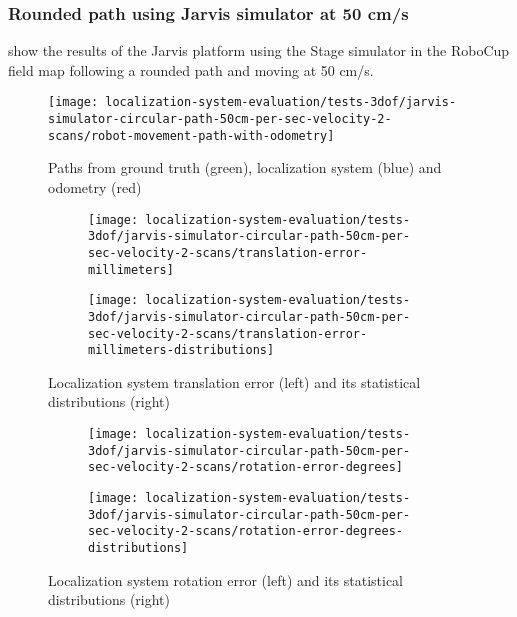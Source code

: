 \subsubsection{Rounded path using Jarvis simulator at 50 cm/s}

 show the results of the Jarvis platform using the Stage simulator in the RoboCup field map following a rounded path and moving at 50 cm/s.

\begin{figure}[H]
	\centering
	\texttt{[image: localization-system-evaluation/tests-3dof/jarvis-simulator-circular-path-50cm-per-sec-velocity-2-scans/robot-movement-path-with-odometry]}
	\caption{Paths from ground truth (green), localization system (blue) and odometry (red)}
	\label{fig:localization-system-evaluation_jarvis-simulator-circular-path-50cm-per-sec-velocity-2-scans}
\end{figure}

\begin{figure}[H]
	\centering
	\begin{subfigure}[h]{0.47\textwidth}
		\centering
		\texttt{[image: localization-system-evaluation/tests-3dof/jarvis-simulator-circular-path-50cm-per-sec-velocity-2-scans/translation-error-millimeters]}
	\end{subfigure}
	\begin{subfigure}[h]{0.47\textwidth}
		\centering
		\texttt{[image: localization-system-evaluation/tests-3dof/jarvis-simulator-circular-path-50cm-per-sec-velocity-2-scans/translation-error-millimeters-distributions]}
	\end{subfigure}
	\caption{Localization system translation error (left) and its statistical distributions (right)}
	\label{fig:localization-system-evaluation_jarvis-simulator-circular-path-50cm-per-sec-velocity-2-scans_translation-errors}
\end{figure}

\begin{figure}[H]
	\centering
	\begin{subfigure}[h]{0.47\textwidth}
		\centering
		\texttt{[image: localization-system-evaluation/tests-3dof/jarvis-simulator-circular-path-50cm-per-sec-velocity-2-scans/rotation-error-degrees]}
	\end{subfigure}
	\begin{subfigure}[h]{0.47\textwidth}
		\centering
		\texttt{[image: localization-system-evaluation/tests-3dof/jarvis-simulator-circular-path-50cm-per-sec-velocity-2-scans/rotation-error-degrees-distributions]}
	\end{subfigure}
	\caption{Localization system rotation error (left) and its statistical distributions (right)}
	\label{fig:localization-system-evaluation_jarvis-simulator-circular-path-50cm-per-sec-velocity-2-scans_rotation-errors}
\end{figure}

